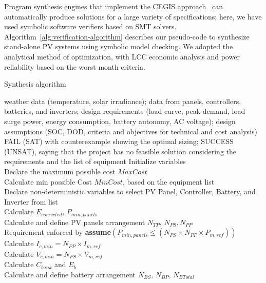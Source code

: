 \documentclass[journal]{IEEEtran}
\begin{document}
Program synthesis engines that implement the CEGIS approach~\cite{sketch} can automatically produce solutions for a large variety of specifications; here, we have used symbolic software verifiers based on SMT solvers.
%
Algorithm~\ref{alg:verification-algorithm} describes our pseudo-code to synthesize stand-alone PV systems using symbolic model checking. We adopted the analytical method of optimization, with LCC economic analysis and power reliability based on the worst month criteria.

 \begin{algorithm}
 \caption{Synthesis algorithm}
 \begin{algorithmic}[1]
 \begin{scriptsize}
 \renewcommand{\algorithmicrequire}{\textbf{Input:}}
 \renewcommand{\algorithmicensure}{\textbf{Output:}}
 \REQUIRE weather data (temperature, solar irradiance); data from panels, controllers, batteries, and inverters; design requirements (load curve, peak demand, load surge power, energy consumption, battery autonomy, AC voltage); design assumptions (SOC, DOD, criteria and objectives for technical and cost analysis)
 \ENSURE FAIL (SAT) with counterexample showing the optimal sizing; SUCCESS (UNSAT), saying that the project has no feasible solution considering the requirements and the list of equipment
 \STATE Initialize variables \\
 \STATE Declare the maximum possible cost $MaxCost$ \\
 \STATE Calculate min possible Cost $MinCost$, based on the equipment list \\
 	\STATE Declare non-deterministic variables to select PV Panel, Controller, Battery, and Inverter from list \\
 	\STATE Calculate $E_{corrected}, \, P_{min,panels} $ \\
	\STATE Calculate and define PV panels arrangement $N_{TP}, \, N_{PS}, N_{PP} $ \\
	\STATE Requirement enforced by \textbf{assume}$(P_{min,panels} \leq (N_{PS} \times N_{PP} \times P_{m,ref}))$ \\
	\STATE Calculate $I_{c,min} = N_{PP} \times I_{m,ref}$ \\
	\STATE Calculate $V_{c,min} = N_{PS} \times V_{m,ref}$ \\
 	\STATE Calculate $C_{bank}$ and $E_{b}$ \\
	\STATE Calculate and define battery arrangement $N_{BS}, \, N_{BP}, \, N_{BTotal}$ \\

\end{scriptsize}
\end{algorithmic}
\end{algorithm}
\end{document}
